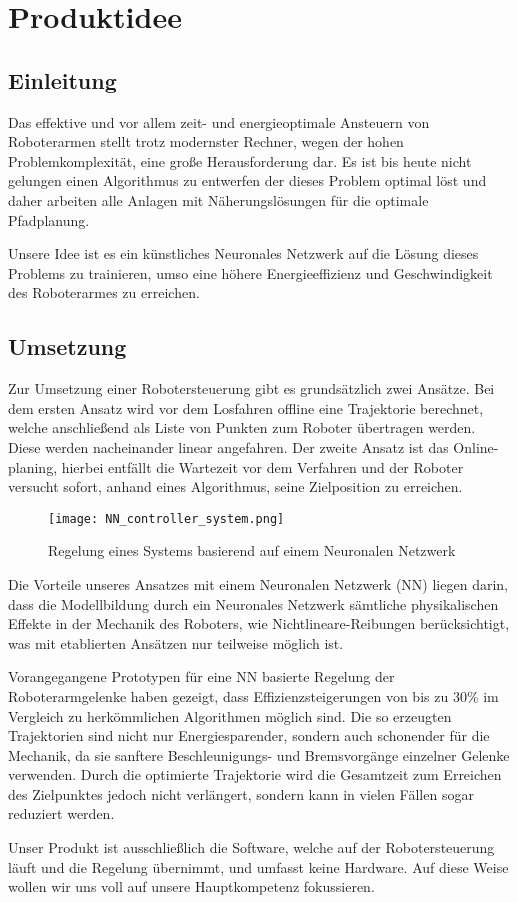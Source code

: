 \chapter{Produktidee}

\section{Einleitung}

Das effektive und vor allem zeit- und energieoptimale Ansteuern von Roboterarmen stellt trotz modernster Rechner, wegen der hohen Problemkomplexität, eine große Herausforderung dar. Es ist bis heute nicht gelungen einen Algorithmus zu entwerfen der dieses Problem optimal löst und daher arbeiten alle Anlagen mit Näherungslösungen für die optimale Pfadplanung.

Unsere Idee ist es ein künstliches Neuronales Netzwerk auf die Lösung dieses Problems zu trainieren, umso eine höhere Energieeffizienz und Geschwindigkeit des Roboterarmes zu erreichen.

\section{Umsetzung}

Zur Umsetzung einer Robotersteuerung gibt es grundsätzlich zwei Ansätze. Bei dem ersten Ansatz wird vor dem Losfahren offline eine Trajektorie berechnet, welche anschließend als Liste von Punkten zum Roboter übertragen werden.  Diese werden nacheinander linear angefahren. Der zweite Ansatz ist das Online-planing, hierbei entfällt die Wartezeit vor dem Verfahren und der Roboter versucht sofort, anhand eines Algorithmus, seine Zielposition zu erreichen. 

\begin{figure}[h]
	\centering
	\texttt{[image: NN\_controller\_system.png]}
	\caption{Regelung eines Systems basierend auf einem Neuronalen Netzwerk}
	\label{fig:NeuralNetworkControlSystem}
\end{figure}

Die Vorteile unseres Ansatzes mit einem Neuronalen Netzwerk (NN) liegen darin, dass die Modellbildung durch ein Neuronales Netzwerk sämtliche physikalischen Effekte in der Mechanik des Roboters, wie Nichtlineare-Reibungen berücksichtigt, was mit etablierten Ansätzen nur teilweise möglich ist.

Vorangegangene Prototypen für eine NN basierte Regelung der Roboterarmgelenke haben gezeigt, dass Effizienzsteigerungen von bis zu 30\% im Vergleich zu herkömmlichen Algorithmen möglich sind. Die so erzeugten Trajektorien sind nicht nur Energiesparender, sondern auch schonender für die Mechanik, da sie sanftere Beschleunigungs- und Bremsvorgänge einzelner Gelenke verwenden. Durch die optimierte Trajektorie wird die Gesamtzeit zum Erreichen des Zielpunktes jedoch nicht verlängert, sondern kann in vielen Fällen sogar reduziert werden.

Unser Produkt ist ausschließlich die Software, welche auf der Robotersteuerung läuft und die Regelung übernimmt, und umfasst keine Hardware. Auf diese Weise wollen wir uns voll auf unsere Hauptkompetenz fokussieren.

